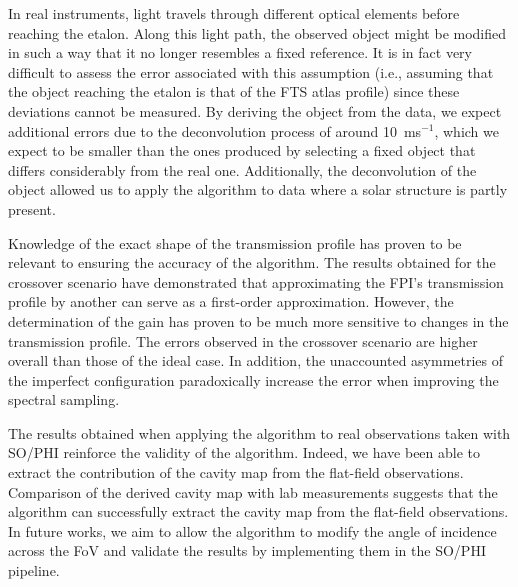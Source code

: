 In real instruments, light travels through different optical elements before reaching the etalon. Along this light path, the observed object might be modified in such a way that it no longer resembles a fixed reference. It is in fact very difficult to assess the error associated with this assumption (i.e., assuming that the object reaching the etalon is that of the FTS atlas profile) since these deviations cannot be measured. By deriving the object from the data, we expect additional errors due to the deconvolution process of around 10~ms$^{-1}$, which we expect to be smaller than the ones produced by selecting a fixed object that differs considerably from the real one. Additionally, the deconvolution of the object allowed us to apply the algorithm to data where a solar structure is partly present.

Knowledge of the exact shape of the transmission profile has proven to be relevant to ensuring the accuracy of the algorithm. The results obtained for the crossover scenario have demonstrated that approximating the FPI's transmission profile by another can serve as a first-order approximation. However, the determination of the gain has proven to be much more sensitive to changes in the transmission profile. The errors observed in the crossover scenario are higher overall than those of the ideal case. In addition, the unaccounted asymmetries of the imperfect configuration paradoxically increase the error when improving the spectral sampling.

The results obtained when applying the algorithm to real observations taken with SO/PHI reinforce the validity of the algorithm. Indeed, we have been able to extract the contribution of the cavity map from the flat-field observations. Comparison of the derived cavity map with lab measurements suggests that the algorithm can successfully extract the cavity map from the flat-field observations. In future works, we aim to allow the algorithm to modify the angle of incidence across the FoV and validate the results by implementing them in the SO/PHI pipeline.


